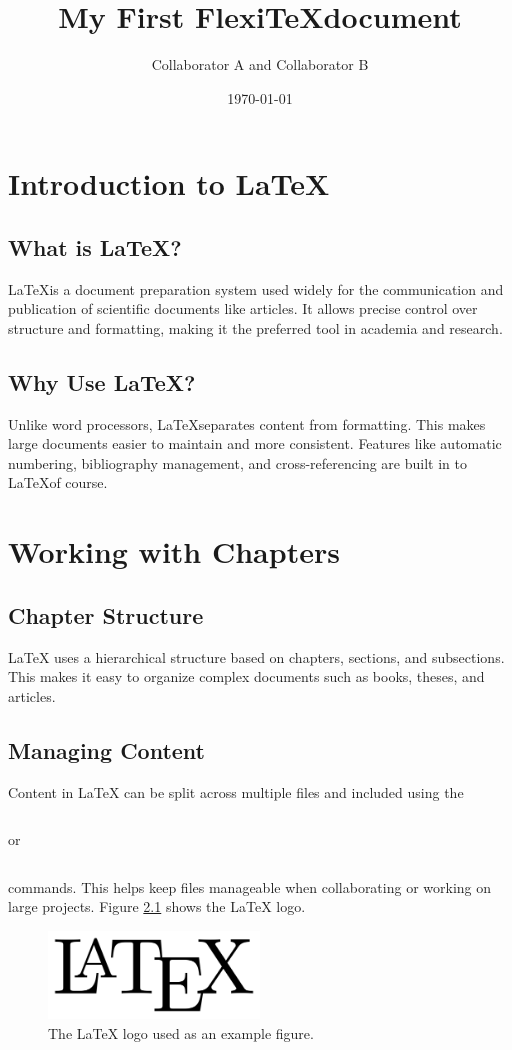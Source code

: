 \documentclass{report}
\title{My First Flexi\TeX document}
\author{Collaborator A and Collaborator B}
\date{\today}
\begin{document}
\maketitle
\chapter{Introduction to \LaTeX}
\section{What is \LaTeX?}
\LaTeX is a document preparation system used widely for the communication and publication of scientific documents like articles. It allows precise control over structure and formatting, making it the preferred tool in academia and research.
\section{Why Use \LaTeX?}
Unlike word processors,
\LaTeX separates content from formatting. This makes large documents easier to maintain and more consistent. Features like automatic numbering, bibliography management, and cross-referencing are built in to
\LaTeX of course.
\chapter{Working with Chapters}
\section{Chapter Structure}
LaTeX uses a hierarchical structure based on chapters, sections, and subsections. This makes it easy to organize complex documents such as books, theses, and articles.
\section{Managing Content}
Content in LaTeX can be split across multiple files and included using the
\begin{verbatim}

\end{verbatim}
or
\begin{verbatim}

\end{verbatim}
commands. This helps keep files manageable when collaborating or working on large projects. Figure
\ref{fig:latex-logo}
shows the LaTeX logo.
\begin{figure}[h]
\centering
\includegraphics[width=0.5\textwidth]{figs/logo.png}
\caption{The LaTeX logo used as an example figure.}
\label{fig:latex-logo}
\end{figure}
\end{document}
